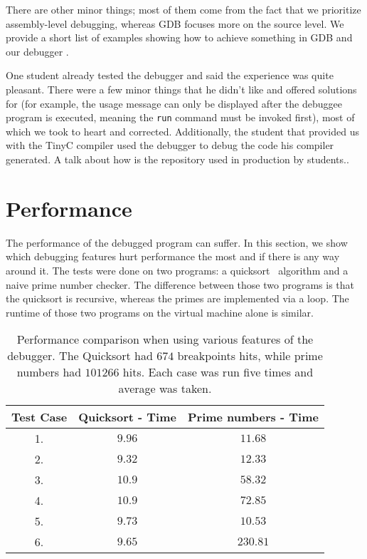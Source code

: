There are other minor things; most of them come from the fact that we
prioritize assembly-level debugging, whereas GDB focuses more on the source
level. We provide a short list of examples showing how to achieve something in
GDB and our debugger .

One student already tested the debugger and said the experience was quite
pleasant. There were a few minor things that he didn't like and offered
solutions for (for example, the usage message can only be displayed after the
debuggee program is executed, meaning the \texttt{run} command must be invoked
first), most of which we took to heart and corrected. Additionally, the student
that provided us with the TinyC compiler used the debugger to debug the code
his compiler generated. A talk about how is the repository used in production
by students..

\section{Performance}
The performance of the debugged program can suffer. In this section, we show
which debugging features hurt performance the most and if there is any way
around it. The tests were done on two programs: a quicksort~\cite{quicksort}
algorithm and a naive prime number checker. The difference between those two programs is that the
quicksort is recursive, whereas the primes are implemented via a loop. The
runtime of those two programs on the virtual machine alone is similar.

\begin{table}[]
\centering
\begin{tabular}{||c c c||}
\hline
Test Case & Quicksort - Time & Prime numbers - Time \\
\hline\hline
1. & $9.96$            & $11.68$  \\
2. & $9.32$            & $12.33$  \\
3. & $10.9$            & $58.32$  \\
4. & $10.9$            & $72.85$  \\
5. & $9.73$            & $10.53$  \\
6. & $9.65$            & $230.81$ \\
\hline
\end{tabular}
\caption{Performance comparison when using various features of the debugger.
The Quicksort had $674$ breakpoints hits, while prime numbers had $101266$ hits.
Each case was run five times and average was taken.}
\label{table:benchmark}
\end{table}

